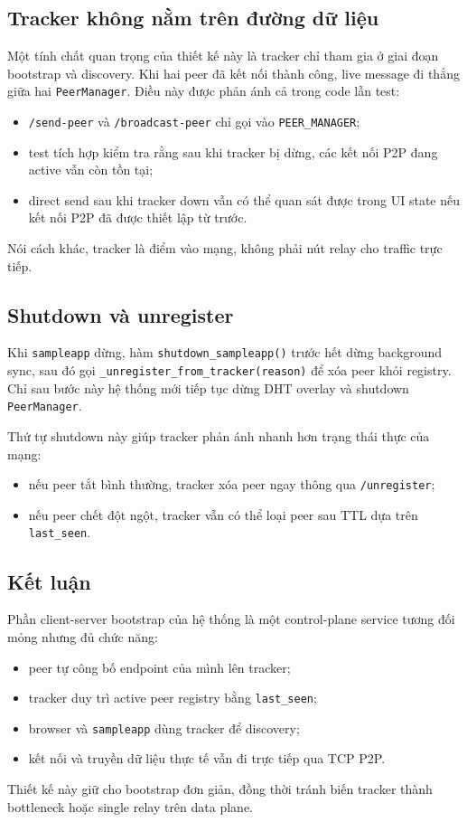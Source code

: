 \subsection{Tracker không nằm trên đường dữ liệu}
Một tính chất quan trọng của thiết kế này là tracker chỉ tham gia ở giai đoạn bootstrap và discovery. Khi hai peer đã kết nối thành công, live message đi thẳng giữa hai \texttt{PeerManager}. Điều này được phản ánh cả trong code lẫn test:
\begin{itemize}[leftmargin=2em]
    \item \texttt{/send-peer} và \texttt{/broadcast-peer} chỉ gọi vào \texttt{PEER\_MANAGER};
    \item test tích hợp kiểm tra rằng sau khi tracker bị dừng, các kết nối P2P đang active vẫn còn tồn tại;
    \item direct send sau khi tracker down vẫn có thể quan sát được trong UI state nếu kết nối P2P đã được thiết lập từ trước.
\end{itemize}

Nói cách khác, tracker là điểm vào mạng, không phải nút relay cho traffic trực tiếp.

\subsection{Shutdown và unregister}
Khi \texttt{sampleapp} dừng, hàm \texttt{shutdown\_sampleapp()} trước hết dừng background sync, sau đó gọi \texttt{\_unregister\_from\_tracker(reason)} để xóa peer khỏi registry. Chỉ sau bước này hệ thống mới tiếp tục dừng DHT overlay và shutdown \texttt{PeerManager}.

Thứ tự shutdown này giúp tracker phản ánh nhanh hơn trạng thái thực của mạng:
\begin{itemize}[leftmargin=2em]
    \item nếu peer tắt bình thường, tracker xóa peer ngay thông qua \texttt{/unregister};
    \item nếu peer chết đột ngột, tracker vẫn có thể loại peer sau TTL dựa trên \texttt{last\_seen}.
\end{itemize}

\subsection{Kết luận}
Phần client-server bootstrap của hệ thống là một control-plane service tương đối mỏng nhưng đủ chức năng:
\begin{itemize}[leftmargin=2em]
    \item peer tự công bố endpoint của mình lên tracker;
    \item tracker duy trì active peer registry bằng \texttt{last\_seen};
    \item browser và \texttt{sampleapp} dùng tracker để discovery;
    \item kết nối và truyền dữ liệu thực tế vẫn đi trực tiếp qua TCP P2P.
\end{itemize}

Thiết kế này giữ cho bootstrap đơn giản, đồng thời tránh biến tracker thành bottleneck hoặc single relay trên data plane.
